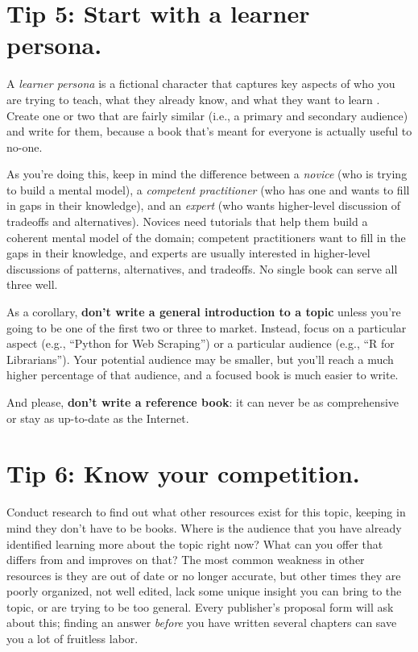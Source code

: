 \documentclass[10pt,letterpaper]{article}
\begin{document}
\section*{Tip 5: Start with a learner persona.}

A \emph{learner persona} is a fictional character that captures key aspects of
who you are trying to teach,
what they already know,
and what they want to learn \cite{Wi2019}.
Create one or two that are fairly similar (i.e., a primary and secondary audience) and write for them,
because a book that's meant for everyone is actually useful to no-one.

As you're doing this,
keep in mind the difference between a \emph{novice} (who is trying to build a mental model),
a \emph{competent practitioner} (who has one and wants to fill in gaps in their knowledge),
and an \emph{expert} (who wants higher-level discussion of tradeoffs and alternatives).
Novices need tutorials that help them build a coherent mental model of the domain;
competent practitioners want to fill in the gaps in their knowledge,
and experts are usually interested in higher-level discussions of patterns, alternatives, and tradeoffs.
No single book can serve all three well.

As a corollary,
\textbf{don't write a general introduction to a topic}
unless you're going to be one of the first two or three to market.
Instead,
focus on a particular aspect (e.g., ``Python for Web Scraping'')
or a particular audience (e.g., ``R for Librarians'').
Your potential audience may be smaller,
but you'll reach a much higher percentage of that audience,
and a focused book is much easier to write.

And please, \textbf{don't write a reference book}:
it can never be as comprehensive or stay as up-to-date as the Internet.

\section*{Tip 6: Know your competition.}

Conduct research to find out what other resources exist for this topic,
keeping in mind they don't have to be books.
Where is the audience that you have already identified learning more about the topic right now?
What can you offer that differs from and improves on that?
The most common weakness in other resources is they are out of date or no longer accurate,
but other times they are poorly organized,
not well edited,
lack some unique insight you can bring to the topic,
or are trying to be too general.
Every publisher's proposal form will ask about this;
finding an answer \emph{before} you have written several chapters
can save you a lot of fruitless labor.
\end{document}
